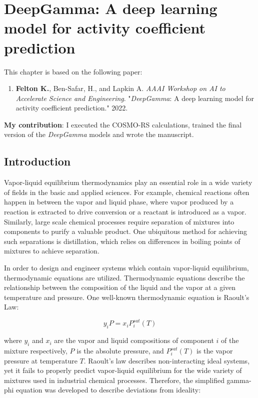 \chapter{DeepGamma: A deep learning model for activity coefficient prediction}\label{ch:deep_gamma} 
This chapter is based on the following paper:
\begin{enumerate}
\item \textbf{Felton K.}, Ben-Safar, H., and Lapkin A. \textit{AAAI Workshop on AI to Accelerate Science and Engineering}. "\textit{DeepGamma}: A deep learning model for activity coefficient prediction." 2022.
\end{enumerate}
\textbf{My contribution}: I executed the COSMO-RS calculations, trained the final version of the \textit{DeepGamma} models and wrote the manuscript.

\section{Introduction}

Vapor-liquid equilibrium thermodynamics play an essential role in a wide variety of fields in the basic and applied sciences. For example, chemical reactions often happen in between the vapor and liquid phase, where vapor produced by a reaction is extracted to drive conversion or a reactant is introduced as a vapor. Similarly, large scale chemical processes require separation of mixtures into components to purify a valuable product. One ubiquitous method for achieving such separations is distillation, which relies on differences in boiling points of mixtures to achieve separation.

In order to design and engineer systems which contain vapor-liquid equilibrium, thermodynamic equations are utilized. Thermodynamic equations describe the relationship between the composition of the liquid and the vapor at a given temperature and pressure. One well-known thermodynamic equation is Raoult's Law: 

\begin{equation}
    \label{ideal-gas}
    y_i P = x_iP_i^{sat}(T)
\end{equation}

where $y_i$ and $x_i$ are the vapor and liquid compositions of component $i$ of the mixture respectively, $P$ is the absolute pressure, and $P_i^{sat}(T)$ is the vapor pressure at temperature $T$. Raoult's law describes non-interacting ideal systems, yet it fails to properly predict vapor-liquid equilibrium for the wide variety of mixtures used in industrial chemical processes. Therefore, the simplified gamma-phi equation was developed to describe deviations from ideality:

